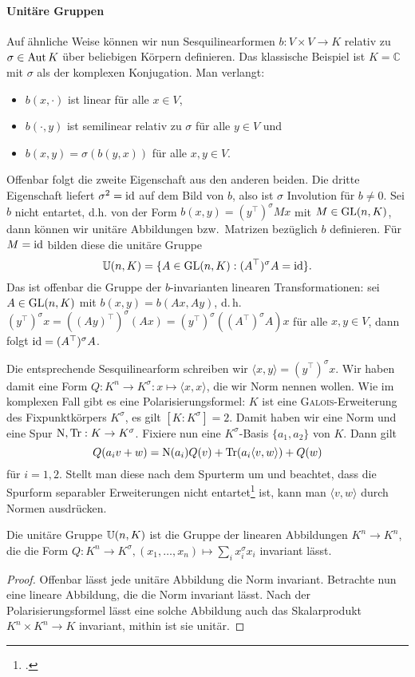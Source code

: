 \paragraph{Unitäre Gruppen} Auf ähnliche Weise können wir nun Sesquilinearformen $b: V \times V \to K$ relativ zu $\sigma \in \operatorname{Aut} K$ über beliebigen Körpern definieren. Das klassische Beispiel ist $K = \mathbb C$ mit $\sigma$ als der komplexen Konjugation. Man verlangt:
\begin{itemize}
\item $b(x, \cdot)$ ist linear für alle $x \in V$,
\item $b(\cdot, y)$ ist semilinear relativ zu $\sigma$ für alle $y \in V$ und
\item $b(x,y) = \sigma(b(y,x))$ für alle $x,y \in V$.
\end{itemize}
Offenbar folgt die zweite Eigenschaft aus den anderen beiden. Die dritte Eigenschaft liefert $\sigma^2 = \operatorname{id}$ auf dem Bild von $b$, also ist $\sigma$ Involution für $b \neq 0$. Sei $b$ nicht entartet, d.h. von der Form $b(x,y) = (y^\top)^\sigma M x$ mit $M \in \mathrm{GL}(n,K)$, dann können wir unitäre Abbildungen bzw.~Matrizen bezüglich $b$ definieren. Für $M = \operatorname{id}$ bilden diese die unitäre Gruppe
\begin{equation}
\mathbb U(n,K) = \{ A \in \mathrm{GL}(n,K): (A^\top)^\sigma A = \operatorname{id} \}.
\end{equation}
Das ist offenbar die Gruppe der $b$-invarianten linearen Transformationen: sei $A \in \mathrm{GL}(n,K)$ mit $b(x,y) = b(Ax,Ay)$, d.\,h. $(y^\top)^\sigma x = ((Ay)^\top)^\sigma (Ax) = (y^\top)^\sigma ((A^\top)^\sigma A) x$ für alle $x, y \in V$, dann folgt $\operatorname{id} = (A^\top)^\sigma A$.

Die entsprechende Sesquilinearform schreiben wir $\langle x, y \rangle = (y^\top)^\sigma x$. Wir haben damit eine Form $Q: K^n \to K^\sigma: x \mapsto \langle x, x \rangle$, die wir Norm nennen wollen. Wie im komplexen Fall gibt es eine Polarisierungsformel: $K$ ist eine \textsc{Galois}-Erweiterung des Fixpunktkörpers $K^\sigma$, es gilt $[K:K^\sigma] = 2$. Damit haben wir eine Norm und eine Spur $\operatorname{N}, \operatorname{Tr}: K \rightarrow K^\sigma$. Fixiere nun eine $K^\sigma$-Basis $\{a_1, a_2\}$ von $K$. Dann gilt
\begin{equation*}
Q(a_i v + w) = \operatorname{N}(a_i) Q(v) + \operatorname{Tr}(a_i \langle v, w \rangle) + Q(w)
\end{equation*}
für $i = 1,2$. Stellt man diese nach dem Spurterm um und beachtet, dass die Spurform separabler Erweiterungen nicht entartet\footcite[S.~199, Satz~7]{Bosch} ist, kann man $\langle v, w \rangle$ durch Normen ausdrücken.
\begin{fact} \label{fact:norminv}
Die unitäre Gruppe $\mathbb U(n,K)$ ist die Gruppe der linearen Abbildungen $K^n \to K^n$, die die Form $Q: K^n \to K^\sigma, (x_1, \dots, x_n) \mapsto \sum_i x_i^\sigma x_i$ invariant lässt.
\end{fact}
\begin{proof}
Offenbar lässt jede unitäre Abbildung die Norm invariant. Betrachte nun eine lineare Abbildung, die die Norm invariant lässt. Nach der Polarisierungsformel lässt eine solche Abbildung auch das Skalarprodukt $K^n \times K^n \to K$ invariant, mithin ist sie unitär.
\end{proof}

